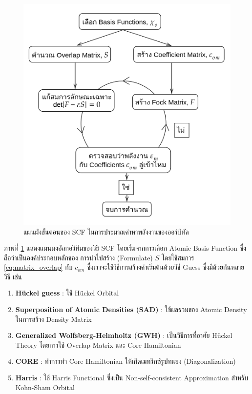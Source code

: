 \begin{figure}[H]
    \centering
    \includegraphics[width=0.8\linewidth]{fig/scf.png}
    \caption{แผนผังขั้นตอนของ SCF ในการประมาณค่าหาพลังงานของออร์บิทัล}
    \label{fig:scf}
\end{figure}

ภาพที่ \ref{fig:scf} แสดงแผนผงอัลกอริทึมของวิธี SCF โดยเริ่มจากการเลือก Atomic Basis Function ซึ่งถือว่าเป็นองค์ประกอบหลักของ%
การนำไปสร้าง (Formulate) $S$ โดยใช้สมการ \ref{eq:matrix_overlap} กับ $c_{om}$ ซึ่งเราจะใช้วิธีการสร้างค่าเริ่มต้นด้วยวิธี Guess 
ซึ่งมีด้วยกันหลายวิธี เช่น

\begin{enumerate}
    \item \textbf{H{\"u}ckel guess} : ใช้ H{\"u}ckel Orbital\autocite{jensen2017}
    
    \item \textbf{Superposition of Atomic Densities (SAD)} : ใช้ผลรวมของ Atomic Density ในการสร้าง Density Matrix
    
    \item \textbf{Generalized Wolfsberg-Helmholtz (GWH)} : เป็นวิธีการที่อาศัย H{\"u}ckel Theory โดยการใช้ Overlap 
    Matrix และ Core Hamiltonian\autocite{wolfsberg1952}
    
    \item \textbf{CORE} : ทำการทำ Core Hamiltonian ให้เกิดเมทริกซ์รูปทแยง (Diagonalization)
    
    \item \textbf{Harris} : ใช้ Harris Functional ซึ่งเป็น Non-self-consistent Approximation สำหรับ Kohn-Sham 
    Orbital\autocite{harris1985}
\end{enumerate}

